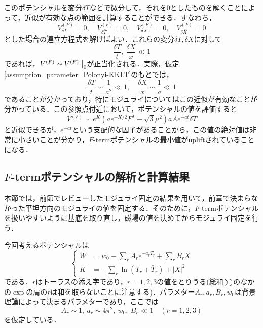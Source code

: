 \documentclass[a4paper,uplatex,dvipdfmx,10pt]{jsarticle}
\theoremstyle{definition}
\begin{document}
このポテンシャルを変分$\delta T$などで微分して，それを0としたものを解くことによって，近似が有効な点の範囲を計算することができる．すなわち，
\begin{equation}
   V^{(F)}_{\delta T}
   =
   0
   ,\quad
   V^{(F)}_{\delta \bar{T}}
   =
   0
   ,\quad
   V^{(F)}_{\delta X}
   =
   0
   ,\quad
   V^{(F)}_{\delta \bar{X}}
   =
   0
   \nonumber
\end{equation}
とした場合の連立方程式を解けばよい．これらの変分$\delta T,\delta X$に対して
\begin{equation}
   \frac{\delta T}{t}
   ,\ 
   \frac{\delta X}{x}
   \ll
   1
   \nonumber
\end{equation}
であれば，$V^{(F)}\sim V^{(F)}\left.\vphantom{\frac{1}{2}}\right|_{0}$が正当化される．実際，仮定\eqref{assumption_parameter_Polonyi-KKLT}のもとでは，
\begin{equation}
   \frac{\delta T}{t}
   \sim
   \frac{1}{a^2}
   \ll
   1
   ,\quad
   \frac{\delta X}{x}
   \sim
   \frac{1}{a}
   \ll
   1
   \nonumber
\end{equation}
であることが分かっており\cite{Abe_MoreFterm_2007a}，特にモジュライについてはこの近似が有効なことが分かっている．この参照点付近において，ポテンシャルの値を評価すると
\begin{equation}
   V^{(F)}
   \sim
   e^{K}
   (
      ae^{-K/2}F^{T}
      -
      \sqrt{3}\mu^2  
   )
   aAe^{-at}\delta T
   \nonumber
\end{equation}
と近似できるが，$e^{-at}$という支配的な因子があることから，この値の絶対値は非常に小さいことが分かり，$F$-termポテンシャルの最小値がupliftされていることになる．


\subsection{\texorpdfstring{$F$}{F}-termポテンシャルの解析と計算結果}

本節では，前節でレビューしたモジュライ固定の結果を用いて，前章で決まらなかった平坦方向のモジュライの値を固定する．そのために，$F$-termポテンシャルを扱いやすいように基底を取り直し，磁場の値を決めてからモジュライ固定を行う．

今回考えるポテンシャルは
\begin{equation}
   \left\{
      \begin{alignedat}{1}
         W
         &=
         w_{0}
         -
         \sum_{r}A_{r}e^{-a_{r}T_{r}}
         +
         \sum_{r}B_{r}X
         \\
         K
         &=
         -
         \sum_{r}\ln(T_{r}+\bar{T}_{r})
         +
         |X|^2
      \end{alignedat}
   \right.
   \label{potential_now_before}
\end{equation}
である．$r$はトーラスの添え字であり，$r=1,2,3$の値をとりうる(総和$\sum$のなかの$\exp$の肩の$r$は和を取らないことに注意する)．パラメター$A_{r},a_{r},B_{r},w_{0}$は背景理論によって決まるパラメターであり，ここでは
\begin{equation}
   A_{r}\sim 1
   ,\ 
   a_{r}\sim 4\pi^2  
   ,\ 
   w_{0},\ B_{r}\ll 1
   \quad
   (r=1,2,3)
   \label{assumption_parameter_now}
\end{equation}
を仮定している．
\end{document}
